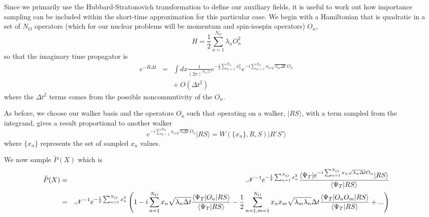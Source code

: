  Since we primarily use the Hubbard-Stratonovich transformation to define
 our auxiliary fields, it is useful to work out how importance sampling
 can be included within the short-time approximation for this particular
 case. We begin with a Hamiltonian that is quadratic in a set of $N_O$ operators
 (which for our nuclear problems will be momentum and spin-isospin operators)
 $O_n$,
 \begin{equation}
 \label{eq.sumofsquares}
 H = \frac{1}{2}\sum_{n=1}^{N_O} \lambda_n O_n^2
 \end{equation}
 so that the imaginary time propagator is
 \begin{eqnarray}
 e^{-H \Delta t} &=&  \int dx \frac{1}{(2\pi)^{N_O/2}}
 e^{-\frac{1}{2}\sum_{n=1}^{N_O} x_n^2}
 e^{-i\sum_{n=1}^{N_O} x_n \sqrt{\lambda_n \Delta t} O_n}
 \nonumber\\
 && + ~ O(\Delta t^2)
 \end{eqnarray}
 where the $\Delta t^2$ terms comes from the possible noncommutivity of the
 $O_n$.
 
 As before, we choose our walker basis and the operators $O_n$ such
 that operating on a walker,
 $|R S\rangle$,
 with a term sampled from the integrand, gives a result
 proportional to another walker
 \begin{equation}
 \label{eq.walkerprop}
 e^{-i \sum_{n=1}^{N_O} x_n\sqrt{\lambda \Delta t} O_n}|RS\rangle =
 W(\{x_n\},R,S) |R'S'\rangle
 \end{equation}
 where $\{x_n\}$ represents the set of sampled $x_n$ values.
 
 We now sample $\tilde P(X)$ which is
 \begin{eqnarray}
 \tilde P(X) &=&
 {\cal N}^{-1}
 e^{-\frac{1}{2} \sum_{n=1}^{N_O} x_n^2}
 \frac{\langle \Psi_T |e^{-i\sum_{n=1}^{N_O}
 		x_n \sqrt{\lambda_n \Delta t} O_n}|R S\rangle}
 {\langle \Psi_T|RS\rangle}
 \nonumber\\
 &=& {\cal N}^{-1}
 e^{-\frac{1}{2} \sum_{n=1}^{N_O} x_n^2}
 \left (1 -i\sum_{n=1}^{N_O} x_n \sqrt{\lambda_n \Delta t}
 \frac{\langle \Psi_T|O_n|R S\rangle}
 {\langle \Psi_T|R S\rangle}
 - \frac{1}{2}\sum_{n=1,m=1}^{N_O}
 x_n x_m\sqrt{\lambda_m \lambda_n} \Delta t
 \frac{\langle \Psi_T|O_nO_m|R S\rangle}
 {\langle \Psi_T|R S\rangle}
 + ... \right )
 \nonumber\\
 \end{eqnarray}
 
